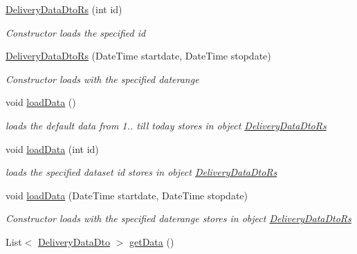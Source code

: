 \begin{DoxyCompactItemize}
\hyperlink{classkpi_mvc_api_1_1_data_transfer_objects_1_1_delivery_data_dto_rs_a329d3c877228b17932f852ebb24a2339}{Delivery\+Data\+Dto\+Rs} (int id)
\begin{DoxyCompactList}\small\item\em Constructor loads the specified id \end{DoxyCompactList}\item 
\hyperlink{classkpi_mvc_api_1_1_data_transfer_objects_1_1_delivery_data_dto_rs_ab4a2e25c208fc08d574771e5054f6f96}{Delivery\+Data\+Dto\+Rs} (Date\+Time startdate, Date\+Time stopdate)
\begin{DoxyCompactList}\small\item\em Constructor loads with the specified daterange \end{DoxyCompactList}\item 
void \hyperlink{classkpi_mvc_api_1_1_data_transfer_objects_1_1_delivery_data_dto_rs_a49d6be9988a6157c75746ca357a44813}{load\+Data} ()
\begin{DoxyCompactList}\small\item\em loads the default data from 1.. till today stores in object {\ttfamily \hyperlink{classkpi_mvc_api_1_1_data_transfer_objects_1_1_delivery_data_dto_rs}{Delivery\+Data\+Dto\+Rs}} \end{DoxyCompactList}\item 
void \hyperlink{classkpi_mvc_api_1_1_data_transfer_objects_1_1_delivery_data_dto_rs_a0f32ca8fceecc3a51dadd09b68029df4}{load\+Data} (int id)
\begin{DoxyCompactList}\small\item\em loads the specified dataset id stores in object {\ttfamily \hyperlink{classkpi_mvc_api_1_1_data_transfer_objects_1_1_delivery_data_dto_rs}{Delivery\+Data\+Dto\+Rs}} \end{DoxyCompactList}\item 
void \hyperlink{classkpi_mvc_api_1_1_data_transfer_objects_1_1_delivery_data_dto_rs_aab956a92693af48a6da78eab193b9ca7}{load\+Data} (Date\+Time startdate, Date\+Time stopdate)
\begin{DoxyCompactList}\small\item\em Constructor loads with the specified daterange stores in object {\ttfamily \hyperlink{classkpi_mvc_api_1_1_data_transfer_objects_1_1_delivery_data_dto_rs}{Delivery\+Data\+Dto\+Rs}} \end{DoxyCompactList}\item 
List$<$ \hyperlink{classkpi_mvc_api_1_1_data_transfer_objects_1_1_delivery_data_dto}{Delivery\+Data\+Dto} $>$ \hyperlink{classkpi_mvc_api_1_1_data_transfer_objects_1_1_delivery_data_dto_rs_a7c771808f4607524b53ee7a65fec5119}{get\+Data} ()

\end{DoxyCompactItemize}
